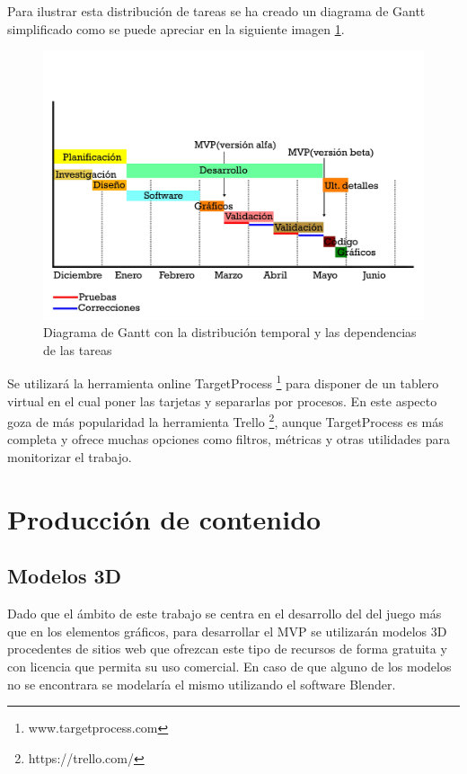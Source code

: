 Para ilustrar esta distribución de tareas se ha creado un diagrama de Gantt simplificado como se puede apreciar en la siguiente imagen \ref{gantt01}.

\begin{figure}
	\begin{center}
		\includegraphics[scale=0.6]{imagenes/GanttDiagram.jpg}
		\caption{Diagrama de Gantt con la distribución temporal y las dependencias de las tareas}
		\label{gantt01}
	\end{center}
\end{figure}

Se utilizará la herramienta online TargetProcess \footnote{www.targetprocess.com} para disponer de un tablero virtual  en el cual poner las tarjetas y separarlas por procesos. En este aspecto goza de más popularidad la herramienta Trello \footnote{https://trello.com/}, aunque TargetProcess es más completa y ofrece muchas opciones como filtros, métricas y otras utilidades para monitorizar el trabajo.

\section{Producción de contenido}
\subsection{Modelos 3D}
Dado que el ámbito de este trabajo se centra en el desarrollo del  del juego más que en los elementos gráficos, para desarrollar el MVP se utilizarán modelos 3D procedentes de sitios web que ofrezcan este tipo de recursos de forma gratuita y con licencia que permita su uso comercial. En caso de que alguno de los modelos no se encontrara se modelaría el mismo utilizando el software Blender. 

